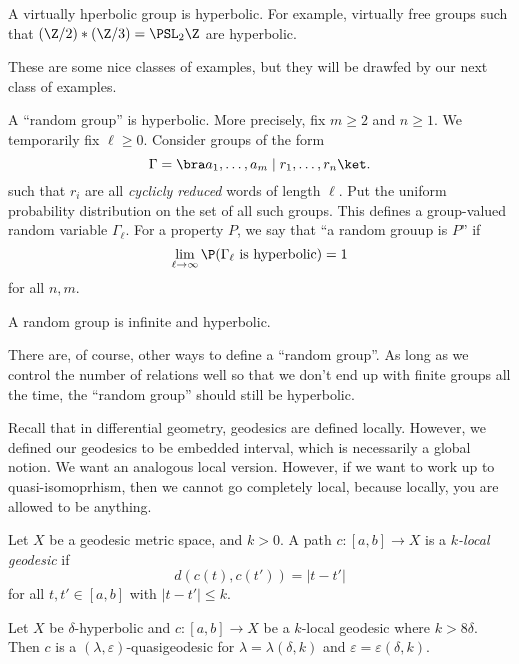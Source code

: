 \documentclass[a4paper]{article}
\begin{document}
\begin{eg}
  A virtually hperbolic group is hyperbolic. For example, virtually free groups such that $(\Z/2) * (\Z/3) = \PSL_2\Z$ are hyperbolic.
\end{eg}

These are some nice classes of examples, but they will be drawfed by our next class of examples.

A ``random group'' is hyperbolic. More precisely, fix $m \geq 2$ and $n \geq 1$. We temporarily fix $\ell \geq 0$. Consider groups of the form
\[
  \Gamma = \bra a_1, \ldots, a_m \mid r_1, \ldots, r_n\ket.
\]
such that $r_i$ are all \emph{cyclicly reduced} words of length $\ell$. Put the uniform probability distribution on the set of all such groups. This defines a group-valued random variable $\Gamma_\ell$. For a property $P$, we say that ``a random grouup is $P$'' if %
\[
  \lim_{\ell \to \infty}\P(\text{$\Gamma_\ell$ is hyperbolic}) = 1
\]
for all $n, m$.
\begin{thm}[Gromov]
  A random group is infinite and hyperbolic.
\end{thm}

There are, of course, other ways to define a ``random group''. As long as we control the number of relations well so that we don't end up with finite groups all the time, the ``random group'' should still be hyperbolic.

Recall that in differential geometry, geodesics are defined locally. However, we defined our geodesics to be embedded interval, which is necessarily a global notion. We want an analogous local version. However, if we want to work up to quasi-isomoprhism, then we cannot go completely local, because locally, you are allowed to be anything.

\begin{defi}
  Let $X$ be a geodesic metric space, and $k > 0$. A path $c: [a, b] \to X$ is a \emph{$k$-local geodesic} if
  \[
    d(c(t), c(t')) = |t - t'|
  \]
  for all $t, t' \in [a, b]$ with $|t - t'| \leq k$.
\end{defi}

\begin{thm}
  Let $X$ be $\delta$-hyperbolic and $c: [a, b] \to X$ be a $k$-local geodesic where $k > 8 \delta$. Then $c$ is a $(\lambda, \varepsilon)$-quasigeodesic for $\lambda = \lambda(\delta, k)$ and $\varepsilon = \varepsilon(\delta, k)$.
\end{thm}
\end{document}
